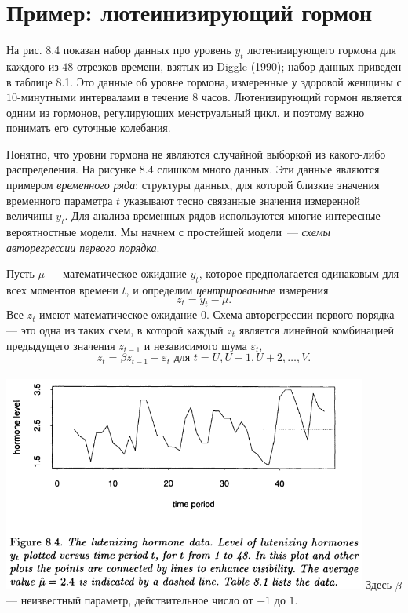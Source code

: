 \section{Пример: лютеинизирующий гормон}

На рис. 8.4 показан набор данных про уровень $y_t$ лютенизирующего гормона для каждого из $48$ отрезков времени, взятых из Diggle (1990); набор данных приведен в таблице 8.1. Это данные об уровне гормона, измеренные у здоровой женщины с $10$-минутными интервалами в течение $8$ часов. Лютенизирующий гормон является одним из гормонов, регулирующих менструальный цикл, и поэтому важно понимать его суточные колебания. 

Понятно, что уровни гормона не являются случайной выборкой из какого-либо распределения. На рисунке 8.4 слишком много данных. Эти данные являются примером \textit{временного ряда}: структуры данных, для которой близкие значения временного параметра $t$ указывают тесно связанные значения измеренной величины $y_t$. Для анализа временных рядов используются многие интересные вероятностные модели. Мы начнем с простейшей модели~--- \textit{схемы авторегрессии первого порядка}.

Пусть $\mu$ --- математическое ожидание $y_t$, которое предполагается одинаковым для всех моментов времени $t$, и определим \textit{центрированные} измерения
\begin{equation}
	z_t = y_t - \mu.
\end{equation}
Все $z_t$ имеют математическое ожидание $0$. Схема авторегрессии первого порядка --- это одна из таких схем, в которой каждый $z_t$ является линейной комбинацией предыдущего значения $z_{t-1}$ и независимого шума $\varepsilon_t$,
\begin{equation}
	z_t = \beta z_{t-1} + \varepsilon_t \text{ для } t = U, U + 1, U + 2, \ldots, V.
\end{equation}
\\[0.5cm]
\noindent
\includegraphics[width=12cm]{8/f84}
\newline
\noindent Здесь $\beta$ --- неизвестный параметр, действительное число от $-1$ до $1$. 

